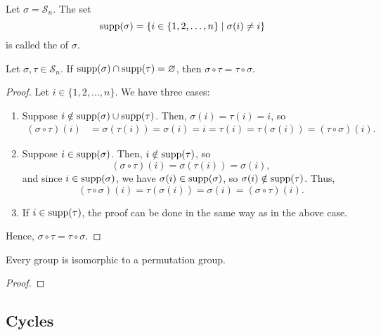 \begin{defn}
Let $ \sigma=\mathcal{S}_n $. The set
\begin{equation*}
    \operatorname{supp}(\sigma)=\{i\in\{1,2,\ldots,n\}\mid\sigma(i)\neq i\}
\end{equation*}
is called the  of $ \sigma $.
\end{defn}

\begin{prop}
Let $ \sigma,\tau\in\mathcal{S}_n $. If $ \operatorname{supp}(\sigma)\cap\operatorname{supp}(\tau)=\varnothing $, then $ \sigma\circ\tau=\tau\circ\sigma $.
\end{prop}
\begin{proof}
Let $ i\in\{1,2,\ldots,n\} $. We have three cases:
\begin{enumerate}
    \item Suppose $ i\notin\operatorname{supp}(\sigma)\cup\operatorname{supp}(\tau) $. Then, $ \sigma(i)=\tau(i)=i $, so
    \begin{align*}
        (\sigma\circ\tau)(i) &= \sigma(\tau(i))=\sigma(i)=i=\tau(i)=\tau(\sigma(i))=(\tau\circ\sigma)(i).
    \end{align*}

    \item Suppose $ i\in\operatorname{supp}(\sigma) $. Then, $ i\notin\operatorname{supp}(\tau) $, so
    \begin{equation*}
        (\sigma\circ\tau)(i)=\sigma(\tau(i))=\sigma(i),
    \end{equation*}
    and since $ i\in\operatorname{supp}(\sigma) $, we have $ \sigma(i)\in\operatorname{supp}(\sigma) $, so $ \sigma(i)\notin\operatorname{supp}(\tau) $. Thus,
    \begin{equation*}
        (\tau\circ\sigma)(i)=\tau(\sigma(i))=\sigma(i)=(\sigma\circ\tau)(i).
    \end{equation*}

    \item If $ i\in\operatorname{supp}(\tau) $, the proof can be done in the same way as in the above case.
\end{enumerate}
Hence, $ \sigma\circ\tau=\tau\circ\sigma $.
\end{proof}

\begin{thm}
Every group is isomorphic to a permutation group.
\end{thm}
\begin{proof}
\end{proof}

\subsection*{Cycles}

